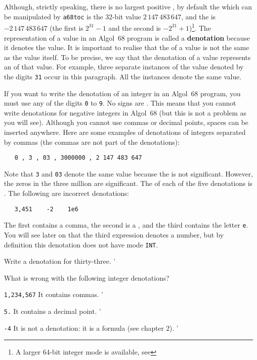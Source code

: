 Although, strictly speaking, there is no largest positive
, by default the  which can be manipulated by \verb|a68toc| is the 32-bit value
$2\,147\,483\,647$, and the  is $-2\,147\,483\,647$ (the first
is $2^{31}-1$ and the second is $-2^{31}+1$)\footnote{A larger 64-bit integer mode is available, see }.
The representation of a
value in an Algol~68 program is called a \textbf{denotation} because
it denotes the value. It is important to realise that the
 of a value is not the same as the value itself. To be
precise, we say that the denotation of a value represents an
 of that value.  For example, three
separate instances of the value denoted by the digits \verb|31| occur
in this paragraph.  All the instances denote the same value.

If you want to write the denotation of an integer in an Algol~68
program, you must use any of the digits \verb|0| to \verb|9|.  No
signs are .  This means that you
cannot write denotations for negative integers in Algol~68 (but this
is not a problem as you will see).  Although you cannot use commas or
decimal points, spaces can be inserted anywhere.  Here are some
examples of denotations of integers separated by commas (the commas
are not part of the denotations):
\begin{verbatim}
   0 , 3 , 03 , 3000000 , 2 147 483 647
\end{verbatim}
\noindent
Note that \verb|3| and \verb|03| denote the same value because the
 is not significant.  However, the zeros in the
three million are significant. The  of each of the five
denotations is . The following are incorrect denotations:
\begin{verbatim}
   3,451    -2    1e6
\end{verbatim}
\noindent
The first contains a comma, the second is a , and the
third contains the letter \verb|e|.  You will see later on that the
third expression denotes a number, but by definition this denotation
does not have mode \verb|INT|.

\begin{exercise}
\item Write a denotation for thirty-three. 
'
\item What is wrong with the following integer denotations?
\begin{subex}
\item \verb|1,234,567| \subans It contains commas.
'
\item \verb|5.| \subans It contains a decimal point.
'
\item \verb|-4| \subans It is not a denotation: it is a formula (see
chapter 2).
'
\end{subex}
\end{exercise}

